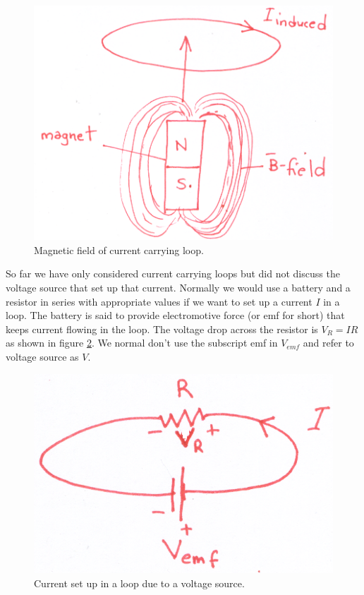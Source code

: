 \documentclass[12pt,a4paper]{article}
\begin{document}
\begin{figure}[H]
\centering
\includegraphics[scale=0.5]{InducedCurrentMagnet.png}
\caption{Magnetic field of current carrying loop.}
\label{Magnet-through-loop}
\end{figure}
So far we have only considered current carrying loops but did not discuss the voltage source that set up that current. Normally we would use a battery and a resistor in series with appropriate values if we want to set up a current $I$ in a loop. The battery is said to provide electromotive force (or emf for short) that keeps current flowing in the loop. The voltage drop across the resistor is $V_R=IR$ as shown in figure \ref{Current-Battery}. We normal don't use the subscript emf in $V_{emf}$ and refer to voltage source as $V$.
\begin{figure}[H]
\centering
\includegraphics[scale=0.5]{CurrentBattery.png}
\caption{Current set up in a loop due to a voltage source.}
\label{Current-Battery}
\end{figure}
\end{document}
